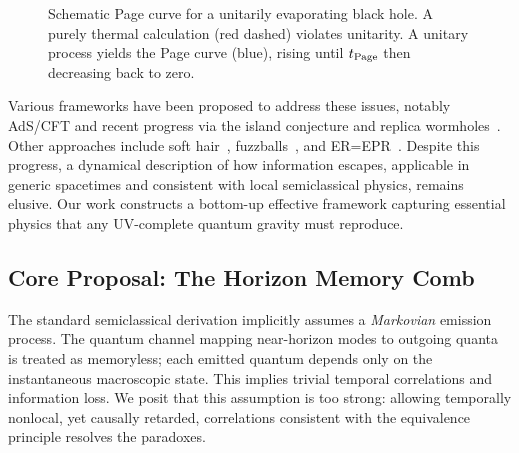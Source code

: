 \documentclass[a4paper,11pt]{article}
\theoremstyle{plain}
\theoremstyle{definition}
\theoremstyle{remark}
\begin{document}
\begin{figure}[htbp]
    \centering
    \caption{Schematic Page curve for a unitarily evaporating black hole. A purely thermal calculation (red dashed) violates unitarity. A unitary process yields the Page curve (blue), rising until $t_{\rm Page}$ then decreasing back to zero.}
    \label{fig:page_curve_intro}
\end{figure}

Various frameworks have been proposed to address these issues, notably AdS/CFT and recent progress via the island conjecture and replica wormholes~\cite{Penington:2020, Almheiri:2020, Chen:2020, Engelhardt:2015}. Other approaches include soft hair~\cite{HPS:2016}, fuzzballs~\cite{Mathur:2005b}, and ER=EPR~\cite{Maldacena:2013}. Despite this progress, a dynamical description of how information escapes, applicable in generic spacetimes and consistent with local semiclassical physics, remains elusive. Our work constructs a bottom-up effective framework capturing essential physics that any UV-complete quantum gravity must reproduce.

\subsection{Core Proposal: The Horizon Memory Comb}

The standard semiclassical derivation implicitly assumes a \emph{Markovian} emission process. The quantum channel mapping near-horizon modes to outgoing quanta is treated as memoryless; each emitted quantum depends only on the instantaneous macroscopic state. This implies trivial temporal correlations and information loss. We posit that this assumption is too strong: allowing temporally nonlocal, yet causally retarded, correlations consistent with the equivalence principle resolves the paradoxes.
\end{document}
